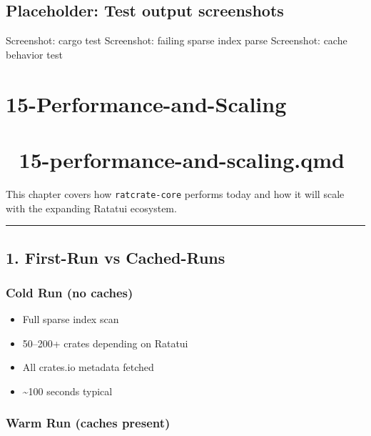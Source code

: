 \documentclass[
  letterpaper,
  DIV=11,
  numbers=noendperiod]{scrreprt}
\providecommand{\tightlist}{%
  \setlength{\itemsep}{0pt}\setlength{\parskip}{0pt}}
\begin{document}
\section{Placeholder: Test output
screenshots}\label{placeholder-test-output-screenshots}

Screenshot: cargo test Screenshot: failing sparse index parse
Screenshot: cache behavior test

\chapter{15-Performance-and-Scaling}\label{performance-and-scaling}

\chapter{\texorpdfstring{📘
\textbf{15-performance-and-scaling.qmd}}{📘 15-performance-and-scaling.qmd}}\label{performance-and-scaling.qmd}

This chapter covers how \texttt{ratcrate-core} performs today and how it
will scale with the expanding Ratatui ecosystem.

\begin{center}\rule{0.5\linewidth}{0.5pt}\end{center}

\section{1. First-Run vs Cached-Runs}\label{first-run-vs-cached-runs}

\subsection{Cold Run (no caches)}\label{cold-run-no-caches}

\begin{itemize}
\tightlist
\item
  Full sparse index scan\\
\item
  50--200+ crates depending on Ratatui\\
\item
  All crates.io metadata fetched\\
\item
  \textasciitilde100 seconds typical
\end{itemize}

\subsection{Warm Run (caches present)}\label{warm-run-caches-present}
\end{document}
